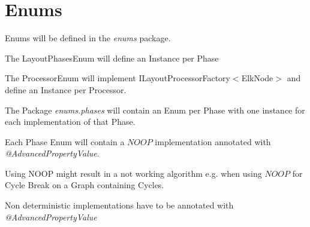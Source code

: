 \section{Enums}

Enums will be defined in the \textit{enums} package.

The LayoutPhasesEnum will define an Instance per Phase

The ProcessorEnum will implement ILayoutProcessorFactory$<$ElkNode$>$ and define an Instance per Processor.

The Package \textit{enums.phases} will contain an Enum per Phase with one
instance for each implementation of that Phase.

Each Phase Enum will contain a $NOOP$ implementation annotated with \textit{@AdvancedPropertyValue}.

Using NOOP might result in a not working algorithm e.g. when using $NOOP$ for Cycle Break on a Graph containing Cycles.

Non deterministic implementations have to be annotated with \textit{@AdvancedPropertyValue}

